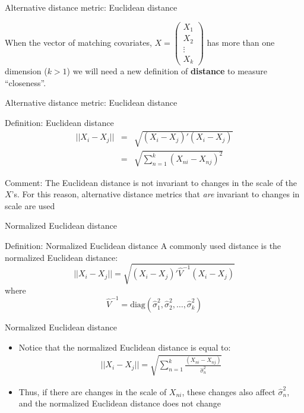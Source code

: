 \documentclass{beamer}
\newcommand*\colvec[1]{\begin{pmatrix}#1\end{pmatrix}}
\begin{document}
{

}


\begin{frame}{Alternative distance metric: Euclidean distance}
	
 When the vector of matching covariates, $X= \colvec{X_1\\X_2\\\vdots\\X_k}$ has more than one dimension ($k>1$) we will need a new definition of \textbf{distance} to measure ``closeness''.  
\end{frame}

\begin{frame}{Alternative distance metric: Euclidean distance}
	\begin{block}{Definition: Euclidean distance}
    \vspace*{-2.5mm}
    \begin{eqnarray*}
    ||X_i-X_j|| &=& \sqrt{ (X_i-X_j)'(X_i-X_j) } \\
    &=& \sqrt{ \sum_{n=1}^k (X_{ni} - X_{nj})^2 }
    \end{eqnarray*}
    \vspace*{-2.5mm}
	\end{block}
	
  \textcolor{picton-blue}{Comment}: The Euclidean distance is not invariant to changes in the scale of the $X$'s.  For this reason, alternative distance metrics that \emph{are} invariant to changes in scale are used
	
\end{frame}


\begin{frame}{Normalized Euclidean distance}

	\begin{block}{Definition: Normalized Euclidean distance}
	  A commonly used distance is the normalized Euclidean distance:$$||X_i-X_j|| = \sqrt{ (X_i-X_j)'\widehat{V}^{-1}(X_i - X_j) }$$ where
		$$\widehat{V}^{-1} = \text{diag}(\widehat{\sigma}_1^2, \widehat{\sigma}_2^2, \dots, \widehat{\sigma}_k^2)$$
	\end{block}
\end{frame}

\begin{frame}{Normalized Euclidean distance}
	\begin{itemize}
	\item Notice that the normalized Euclidean distance is equal to:
		\begin{eqnarray*}
		||X_i - X_j|| = \sqrt{\sum_{n=1}^k \frac{(X_{ni} - X_{nj})}{\widehat{\sigma}^2_n}}
		\end{eqnarray*}
	\item Thus, if there are changes in the scale of $X_{ni}$, these changes also affect $\widehat{\sigma}^2_n$, and the normalized Euclidean distance does not change
	\end{itemize}

\end{frame}
\end{document}
